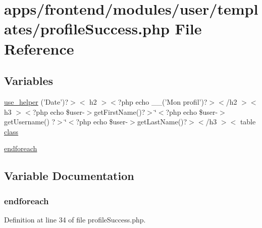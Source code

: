 \hypertarget{profile_success_8php}{\section{apps/frontend/modules/user/templates/profile\-Success.php File Reference}
\label{profile_success_8php}
}
\subsection*{Variables}
\begin{DoxyCompactItemize}
\item 
\hyperlink{profile_success_8php_ace89372310923d6f600afebd15de1d12}{use\-\_\-helper} ('Date')?$>$$<$ h2 $>$$<$?php echo \-\_\-\-\_\-('Mon profil')?$>$$<$/h2 $>$$<$ h3 $>$$<$?php echo \$user-\/$>$get\-First\-Name()?$>$\char`\"{}$<$?php echo \$user-\/$>$get\-Username() ?$>$\char`\"{}$<$?php echo \$user-\/$>$get\-Last\-Name()?$>$$<$/h3 $>$$<$ table \hyperlink{live_2modules_2news_2templates_2__actualitelight_8php_a185c73c6507391d1eb38c776b68ce96d}{class}
\item 
\hyperlink{profile_success_8php_a672d9707ef91db026c210f98cc601123}{endforeach}
\end{DoxyCompactItemize}


\subsection{Variable Documentation}
\hypertarget{profile_success_8php_a672d9707ef91db026c210f98cc601123}{
\subsubsection[{endforeach}]{\setlength{\rightskip}{0pt plus 5cm}endforeach}}\label{profile_success_8php_a672d9707ef91db026c210f98cc601123}


Definition at line 34 of file profile\-Success.\-php.

